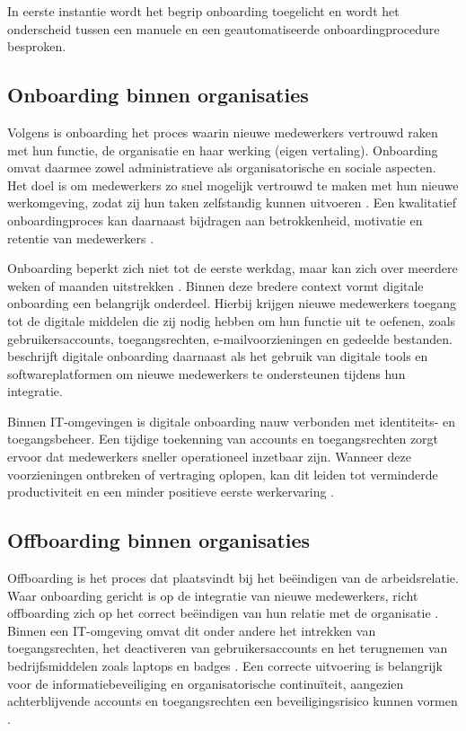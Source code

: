 In eerste instantie wordt het begrip onboarding toegelicht en wordt het onderscheid tussen een manuele en een geautomatiseerde onboardingprocedure besproken.  

\subsection{Onboarding binnen organisaties}

Volgens \textcite{Cambridge} is onboarding het proces waarin nieuwe medewerkers vertrouwd raken met hun functie, de organisatie en haar werking (eigen vertaling). Onboarding omvat daarmee zowel administratieve als organisatorische en sociale aspecten. Het doel is om medewerkers zo snel mogelijk vertrouwd te maken met hun nieuwe werkomgeving, zodat zij hun taken zelfstandig kunnen uitvoeren \autocite{Personio}. Een kwalitatief onboardingproces kan daarnaast bijdragen aan betrokkenheid, motivatie en retentie van medewerkers \autocite{Studytube2024}.

Onboarding beperkt zich niet tot de eerste werkdag, maar kan zich over meerdere weken of maanden uitstrekken \autocite{Personioa}. Binnen deze bredere context vormt digitale onboarding een belangrijk onderdeel. Hierbij krijgen nieuwe medewerkers toegang tot de digitale middelen die zij nodig hebben om hun functie uit te oefenen, zoals gebruikersaccounts, toegangsrechten, e-mailvoorzieningen en gedeelde bestanden. \Textcite{Personio} beschrijft digitale onboarding daarnaast als het gebruik van digitale tools en softwareplatformen om nieuwe medewerkers te ondersteunen tijdens hun integratie.

Binnen IT-omgevingen is digitale onboarding nauw verbonden met identiteits- en toegangsbeheer. Een tijdige toekenning van accounts en toegangsrechten zorgt ervoor dat medewerkers sneller operationeel inzetbaar zijn. Wanneer deze voorzieningen ontbreken of vertraging oplopen, kan dit leiden tot verminderde productiviteit en een minder positieve eerste werkervaring \autocite{Forp2026}.

\subsection{Offboarding binnen organisaties}

Offboarding is het proces dat plaatsvindt bij het beëindigen van de arbeidsrelatie. Waar onboarding gericht is op de integratie van nieuwe medewerkers, richt offboarding zich op het correct beëindigen van hun relatie met de organisatie \autocite{Acerta}. Binnen een IT-omgeving omvat dit onder andere het intrekken van toegangsrechten, het deactiveren van gebruikersaccounts en het terugnemen van bedrijfsmiddelen zoals laptops en badges \autocite{Detsika2025}. Een correcte uitvoering is belangrijk voor de informatiebeveiliging en organisatorische continuïteit, aangezien achterblijvende accounts en toegangsrechten een beveiligingsrisico kunnen vormen \autocite{Detsika2025}.

